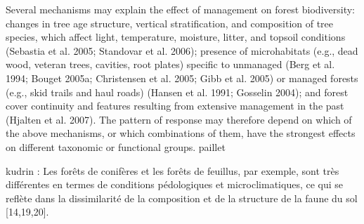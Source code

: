   Several mechanisms may explain the effect of management on forest biodiversity: changes in tree age structure, vertical stratification, and composition of tree species, which affect light, temperature, moisture, litter, and topsoil conditions (Sebastia et al. 2005; Standovar et al. 2006); presence of microhabitats (e.g., dead wood, veteran trees, cavities, root plates) specific to unmanaged (Berg et al. 1994; Bouget 2005a; Christensen et al. 2005; Gibb et al. 2005) or managed forests (e.g., skid trails and haul roads) (Hansen et al. 1991; Gosselin 2004); and forest cover continuity and features resulting from extensive management in the past (Hjalten et al. 2007). The pattern of response may therefore depend on which of the above mechanisms, or which combinations of them, have the strongest effects on different taxonomic or functional groups. paillet 

  kudrin :
Les forêts de conifères et les forêts de feuillus, par exemple, sont très différentes en termes de conditions pédologiques et microclimatiques, ce qui se reflète dans la dissimilarité de la composition et de la structure de la faune du sol [14,19,20].



